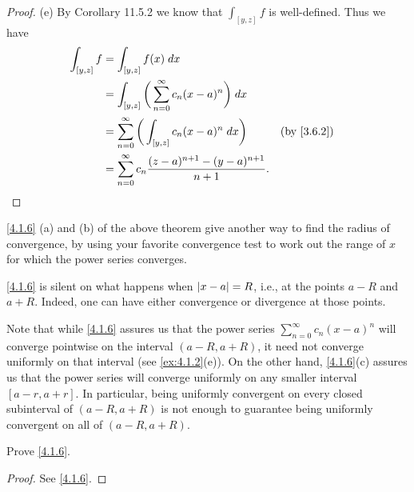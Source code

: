 \begin{proof}{(e)}
  By Corollary 11.5.2 we know that \(\int_{[y, z]} f\) is well-defined.
  Thus we have
  \begin{align*}
    \int_{[y, z]} f & = \int_{[y, z]} f(x) \; dx                                                                                \\
                    & = \int_{[y, z]} \bigg(\sum_{n = 0}^\infty c_n (x - a)^n\bigg) \; dx                                       \\
                    & = \sum_{n = 0}^\infty \bigg(\int_{[y, z]} c_n (x - a)^n \; dx\bigg)         &  & \text{(by \cref{3.6.2})} \\
                    & = \sum_{n = 0}^\infty c_n \dfrac{(z - a)^{n + 1} - (y - a)^{n + 1}}{n + 1}.
  \end{align*}
\end{proof}

\begin{note}
  \cref{4.1.6} (a) and (b) of the above theorem give another way to find the radius of convergence, by using your favorite convergence test to work out the range of \(x\) for which the power series converges.
\end{note}

\setcounter{thm}{7}
\begin{rmk}\label{4.1.8}
  \cref{4.1.6} is silent on what happens when \(\left\lvert x - a\right\rvert = R\), i.e., at the points \(a - R\) and \(a + R\).
  Indeed, one can have either convergence or divergence at those points.
\end{rmk}

\begin{rmk}\label{4.1.9}
  Note that while \cref{4.1.6} assures us that the power series \(\sum_{n = 0}^\infty c_n (x - a)^n\) will converge pointwise on the interval \((a - R, a + R)\), it need not converge uniformly on that interval
  (see \cref{ex:4.1.2}(e)).
  On the other hand, \cref{4.1.6}(c) assures us that the power series will converge uniformly on any smaller interval \([a - r, a + r]\).
  In particular, being uniformly convergent on every closed subinterval of \((a - R, a + R)\) is not enough to guarantee being uniformly convergent on all of \((a - R, a + R)\).
\end{rmk}

\exercisesection

\begin{ex}\label{ex:4.1.1}
  Prove \cref{4.1.6}.
\end{ex}

\begin{proof}
  See \cref{4.1.6}.
\end{proof}


